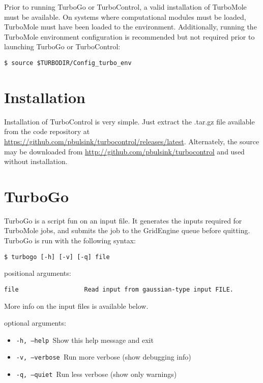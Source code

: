 Prior to running TurboGo or TurboControl, a valid installation of TurboMole must be available. On systems where computational modules must be loaded, TurboMole must have been loaded to the environment. Additionally, running the TurboMole environment configuration is recommended but not required prior to launching TurboGo or TurboControl:

\begin{center}
\begin{verbatim}
$ source $TURBODIR/Config_turbo_env
\end{verbatim}
\end{center}

\section{Installation}
Installation of TurboControl is very simple. Just extract the .tar.gz file available from the code repository at \url{https://github.com/pbulsink/turbocontrol/releases/latest}. Alternately, the source may be downloaded from \url{http://github.com/pbulsink/turbocontrol} and used without installation.

\section{TurboGo}

TurboGo is a script fun on an input file. It generates the inputs required for TurboMole jobs, and submits the job to the GridEngine queue before quitting. TurboGo is run with the following syntax:

\begin{center}
\begin{verbatim}
$ turbogo [-h] [-v] [-q] file
\end{verbatim}
\end{center}

positional arguments:

\begin{Verbatim}[baselinestretch=0.75]
file                  Read input from gaussian-type input FILE.
\end{Verbatim}

More info on the input files is available below.

optional arguments:

\begin{itemize}
\item \texttt{-h, --help            }Show this help message and exit
\item \texttt{-v, --verbose         }Run more verbose (show debugging info)
\item \texttt{-q, --quiet           }Run less verbose (show only warnings)
\end{itemize}

